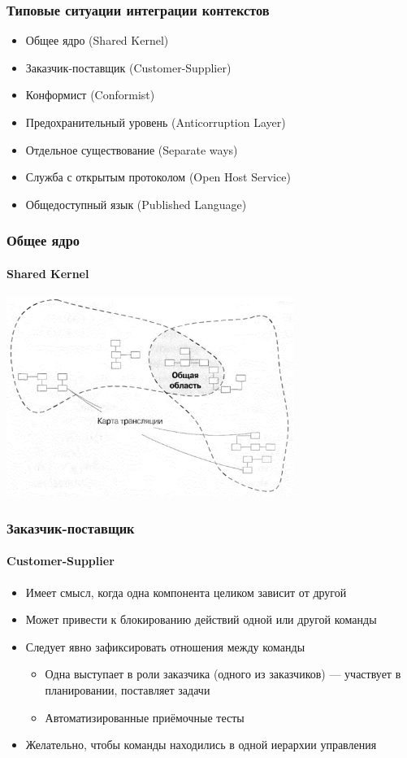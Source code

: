 \documentclass[xetex,mathserif,serif]{beamer}
\begin{document}
	\begin{frame}
		\frametitle{Типовые ситуации интеграции контекстов}
		\begin{itemize}
			\item Общее ядро (Shared Kernel)
			\item Заказчик-поставщик (Customer-Supplier)
			\item Конформист (Conformist)
			\item Предохранительный уровень (Anticorruption Layer)
			\item Отдельное существование (Separate ways)
			\item Служба с открытым протоколом (Open Host Service)
			\item Общедоступный язык (Published Language)
		\end{itemize}
	\end{frame}

	\begin{frame}
		\frametitle{Общее ядро}
		\framesubtitle{Shared Kernel}
		\begin{center}
			\includegraphics[width=0.7\textwidth]{sharedKernel.png}
		\end{center}
	\end{frame}

	\begin{frame}
		\frametitle{Заказчик-поставщик}
		\framesubtitle{Customer-Supplier}
		\begin{itemize}
			\item Имеет смысл, когда одна компонента целиком зависит от другой
			\item Может привести к блокированию действий одной или другой команды
			\item Следует явно зафиксировать отношения между команды
			\begin{itemize}
				\item Одна выступает в роли заказчика (одного из заказчиков) --- участвует в планировании, поставляет задачи
				\item Автоматизированные приёмочные тесты
			\end{itemize}
			\item Желательно, чтобы команды находились в одной иерархии управления
		\end{itemize}
	\end{frame}
\end{document}
